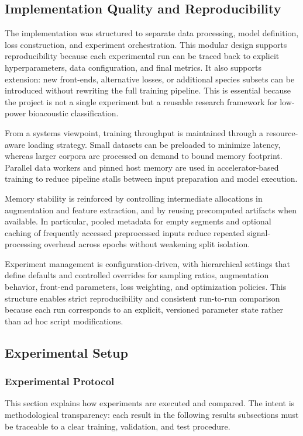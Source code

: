 \documentclass[a4paper,singleside,12pt]{report} %
\begin{document}
	\subsection{Implementation Quality and Reproducibility}
	The implementation was structured to separate data processing, model definition, loss construction, and experiment orchestration. This modular design supports reproducibility because each experimental run can be traced back to explicit hyperparameters, data configuration, and final metrics. It also supports extension: new front-ends, alternative losses, or additional species subsets can be introduced without rewriting the full training pipeline. This is essential because the project is not a single experiment but a reusable research framework for low-power bioacoustic classification.

	From a systems viewpoint, training throughput is maintained through a resource-aware loading strategy. Small datasets can be preloaded to minimize latency, whereas larger corpora are processed on demand to bound memory footprint. Parallel data workers and pinned host memory are used in accelerator-based training to reduce pipeline stalls between input preparation and model execution.

	Memory stability is reinforced by controlling intermediate allocations in augmentation and feature extraction, and by reusing precomputed artifacts when available. In particular, pooled metadata for empty segments and optional caching of frequently accessed preprocessed inputs reduce repeated signal-processing overhead across epochs without weakening split isolation.

	Experiment management is configuration-driven, with hierarchical settings that define defaults and controlled overrides for sampling ratios, augmentation behavior, front-end parameters, loss weighting, and optimization policies. This structure enables strict reproducibility and consistent run-to-run comparison because each run corresponds to an explicit, versioned parameter state rather than ad hoc script modifications.

	\subsection{Experimental Setup}
	\subsubsection{Experimental Protocol}
	This section explains how experiments are executed and compared. The intent is methodological transparency: each result in the following results subsections must be traceable to a clear training, validation, and test procedure.
\end{document}
